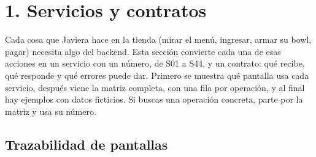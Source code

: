
\section{1. Servicios y contratos}

Cada cosa que Javiera hace en la tienda (mirar el menú, ingresar, armar su bowl, pagar) necesita algo del backend. Esta sección convierte cada una de esas acciones en un servicio con un número, de S01 a S44, y un contrato: qué recibe, qué responde y qué errores puede dar. Primero se muestra qué pantalla usa cada servicio, después viene la matriz completa, con una fila por operación, y al final hay ejemplos con datos ficticios. Si buscas una operación concreta, parte por la matriz y usa su número.


\subsection{Trazabilidad de pantallas}

